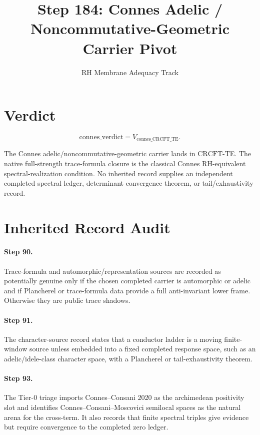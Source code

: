\documentclass[11pt]{article}
\title{Step 184: Connes Adelic / Noncommutative-Geometric Carrier Pivot}
\author{RH Membrane Adequacy Track}
\date{}
\newcommand{\CRCFT}{\mathrm{CRCFT}}
\begin{document}
\maketitle

\section*{Verdict}

\[
\boxed{\mathrm{connes\_verdict}=V_{\mathrm{connes\_CRCFT\_TE}}.}
\]

The Connes adelic/noncommutative-geometric carrier lands in
\(\CRCFT\)-TE.  The native full-strength trace-formula closure is the
classical Connes RH-equivalent spectral-realization condition.  No inherited
record supplies an independent completed spectral ledger, determinant
convergence theorem, or tail/exhaustivity record.

\section*{Inherited Record Audit}

\paragraph{Step 90.}
Trace-formula and automorphic/representation sources are recorded as
potentially genuine only if the chosen completed carrier is automorphic or
adelic and if Plancherel or trace-formula data provide a full anti-invariant
lower frame.  Otherwise they are public trace shadows.

\paragraph{Step 91.}
The character-source record states that a conductor ladder is a moving
finite-window source unless embedded into a fixed completed response space,
such as an adelic/idele-class character space, with a Plancherel or
tail-exhaustivity theorem.

\paragraph{Step 93.}
The Tier-0 triage imports Connes--Consani 2020 as the archimedean positivity
slot and identifies Connes--Consani--Moscovici semilocal spaces as the natural
arena for the cross-term.  It also records that finite spectral triples give
evidence but require convergence to the completed zero ledger.
\end{document}
